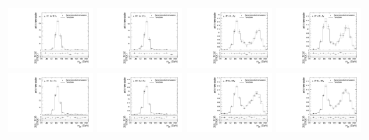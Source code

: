 \begin{figure}[htbp]
  \includegraphics[width=0.2\textwidth]{fig/2Dfit/templateVsReco_res_r0_MJ_mu_HP_vbf_LDy.pdf}
  \includegraphics[width=0.2\textwidth]{fig/2Dfit/templateVsReco_res_r0_MJ_e_HP_vbf_LDy.pdf}
  \includegraphics[width=0.2\textwidth]{fig/2Dfit/templateVsReco_res_r0_MJ_mu_LP_vbf_LDy.pdf}
  \includegraphics[width=0.2\textwidth]{fig/2Dfit/templateVsReco_res_r0_MJ_e_LP_vbf_LDy.pdf}\\
  \includegraphics[width=0.2\textwidth]{fig/2Dfit/templateVsReco_res_r0_MJ_mu_HP_bb_HDy.pdf}
  \includegraphics[width=0.2\textwidth]{fig/2Dfit/templateVsReco_res_r0_MJ_e_HP_bb_HDy.pdf}
  \includegraphics[width=0.2\textwidth]{fig/2Dfit/templateVsReco_res_r0_MJ_mu_LP_bb_HDy.pdf}
  \includegraphics[width=0.2\textwidth]{fig/2Dfit/templateVsReco_res_r0_MJ_e_LP_bb_HDy.pdf}\\

\end{figure}
